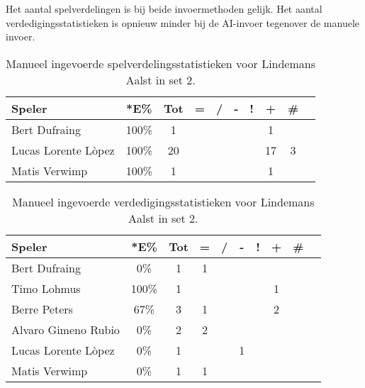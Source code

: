 Het aantal spelverdelingen is bij beide invoermethoden gelijk. Het aantal verdedigingsstatistieken is opnieuw minder bij de AI-invoer tegenover de manuele invoer.

\begin{table}[ht!]
    \centering
    \scriptsize
    \begin{tabular}{|l|c|c|c|c|c|c|c|c|c|}
        \hline
        \textbf{Speler} & *E\% & Tot & = & / & - & ! & + & \# \\ \hline
        Bert Dufraing & 100\% & 1 &  &  & &  & 1 & \\ 
        Lucas Lorente Lòpez & 100\% & 20 &  &  & & & 17 & 3 \\ 
        Matis Verwimp & 100\% & 1 & & & & & 1 & \\ \hline
    \end{tabular}
    \caption[Manueel ingevoerde spelverdelingsstatistieken voor Lindemans Aalst in set 2]{\label{tab:PL3SetAalstMan2}Manueel ingevoerde spelverdelingsstatistieken voor Lindemans Aalst in set 2.}
\end{table}

\begin{table}[ht!]
    \centering
    \scriptsize
    \begin{tabular}{|l|c|c|c|c|c|c|c|c|c|}
        \hline
        \textbf{Speler} & *E\% & Tot & = & / & - & ! & + & \# \\ \hline
        Bert Dufraing & 0\% & 1 & 1 &  &  &  &  & \\ 
        Timo Lohmus & 100\% & 1 &  &  &  &  & 1 & \\ 
        Berre Peters & 67\% & 3 & 1 &  &  &  & 2 & \\ 
        Alvaro Gimeno Rubio & 0\% & 2 & 2 &  &  &  &  & \\ 
        Lucas Lorente Lòpez & 0\% & 1 &  &  & 1 &  &  & \\ 
        Matis Verwimp & 0\% & 1 & 1 & & & & & \\\hline
    \end{tabular}
    \caption[Manueel ingevoerde verdedigingsstatistieken voor Lindemans Aalst in set 2]{\label{tab:PL3DigAalstMan2}Manueel ingevoerde verdedigingsstatistieken voor Lindemans Aalst in set 2.}
\end{table}

